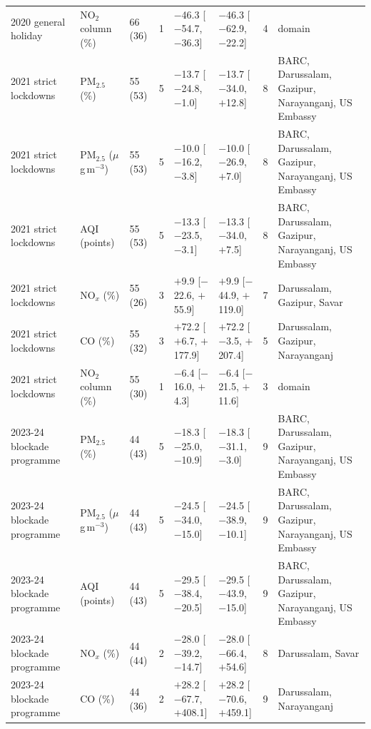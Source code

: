 \begin{longtable}{L{2.6cm} L{2.2cm} C{1.1cm} C{0.4cm} C{2.6cm} C{2.6cm} C{0.7cm} L{2.6cm}}
2020 general holiday & NO$_2$ column (\%) & 66 (36) & 1 & $-$46.3 {\scriptsize[$-$54.7, $-$36.3]} & $-$46.3 {\scriptsize[$-$62.9, $-$22.2]} & 4 & domain \\
2021 strict lockdowns & PM$_{2.5}$ (\%) & 55 (53) & 5 & $-$13.7 {\scriptsize[$-$24.8, $-$1.0]} & $-$13.7 {\scriptsize[$-$34.0, $+$12.8]} & 8 & BARC, Darussalam, Gazipur, Narayanganj, US Embassy \\
2021 strict lockdowns & PM$_{2.5}$ ($\mu$g\,m$^{-3}$) & 55 (53) & 5 & $-$10.0 {\scriptsize[$-$16.2, $-$3.8]} & $-$10.0 {\scriptsize[$-$26.9, $+$7.0]} & 8 & BARC, Darussalam, Gazipur, Narayanganj, US Embassy \\
2021 strict lockdowns & AQI (points) & 55 (53) & 5 & $-$13.3 {\scriptsize[$-$23.5, $-$3.1]} & $-$13.3 {\scriptsize[$-$34.0, $+$7.5]} & 8 & BARC, Darussalam, Gazipur, Narayanganj, US Embassy \\
2021 strict lockdowns & NO$_x$ (\%) & 55 (26) & 3 & $+$9.9 {\scriptsize[$-$22.6, $+$55.9]} & $+$9.9 {\scriptsize[$-$44.9, $+$119.0]} & 7 & Darussalam, Gazipur, Savar \\
2021 strict lockdowns & CO (\%) & 55 (32) & 3 & $+$72.2 {\scriptsize[$+$6.7, $+$177.9]} & $+$72.2 {\scriptsize[$-$3.5, $+$207.4]} & 5 & Darussalam, Gazipur, Narayanganj \\
2021 strict lockdowns & NO$_2$ column (\%) & 55 (30) & 1 & $-$6.4 {\scriptsize[$-$16.0, $+$4.3]} & $-$6.4 {\scriptsize[$-$21.5, $+$11.6]} & 3 & domain \\
2023-24 blockade programme & PM$_{2.5}$ (\%) & 44 (43) & 5 & $-$18.3 {\scriptsize[$-$25.0, $-$10.9]} & $-$18.3 {\scriptsize[$-$31.1, $-$3.0]} & 9 & BARC, Darussalam, Gazipur, Narayanganj, US Embassy \\
2023-24 blockade programme & PM$_{2.5}$ ($\mu$g\,m$^{-3}$) & 44 (43) & 5 & $-$24.5 {\scriptsize[$-$34.0, $-$15.0]} & $-$24.5 {\scriptsize[$-$38.9, $-$10.1]} & 9 & BARC, Darussalam, Gazipur, Narayanganj, US Embassy \\
2023-24 blockade programme & AQI (points) & 44 (43) & 5 & $-$29.5 {\scriptsize[$-$38.4, $-$20.5]} & $-$29.5 {\scriptsize[$-$43.9, $-$15.0]} & 9 & BARC, Darussalam, Gazipur, Narayanganj, US Embassy \\
2023-24 blockade programme & NO$_x$ (\%) & 44 (44) & 2 & $-$28.0 {\scriptsize[$-$39.2, $-$14.7]} & $-$28.0 {\scriptsize[$-$66.4, $+$54.6]} & 8 & Darussalam, Savar \\
2023-24 blockade programme & CO (\%) & 44 (36) & 2 & $+$28.2 {\scriptsize[$-$67.7, $+$408.1]} & $+$28.2 {\scriptsize[$-$70.6, $+$459.1]} & 9 & Darussalam, Narayanganj \\

\end{longtable}
